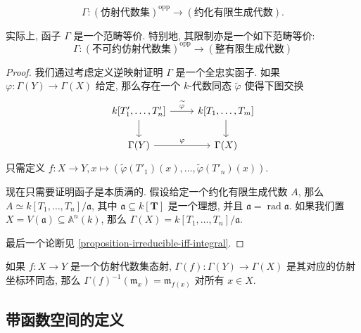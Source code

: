 \[
  \Gamma: (\text{仿射代数集})^{\operatorname{opp}} \to
  (\text{约化有限生成代数}).
\]

\begin{proposition}
  \label{proposition-category-equivalence-irreducible-affine-and-finite-generated-algebra}
  实际上, 函子 \( \Gamma \) 是一个范畴等价. 特别地, 其限制亦是一个如下范畴等价:
  \[
    \Gamma: (\text{不可约仿射代数集})^{\operatorname{opp}} \to
    (\text{整有限生成代数})
  \]
\end{proposition}
\begin{proof}
  我们通过考虑定义逆映射证明 \( \Gamma \) 是一个全忠实函子.
  如果 \( \varphi: \Gamma(Y) \to \Gamma(X) \) 给定, 那么存在一个 \( k
  \)-代数同态 \( \widetilde{\varphi} \) 使得下图交换
  \[\begin{tikzcd}
    {k[T_1', \ldots, T'_n]} & {k[T_1,\ldots,T_m]} \\
    {\Gamma(Y)} & {\Gamma(X)}
    \arrow["{\widetilde{\varphi}}", from=1-1, to=1-2]
    \arrow[from=1-1, to=2-1]
    \arrow[from=1-2, to=2-2]
    \arrow["\varphi", from=2-1, to=2-2]
  \end{tikzcd}\]
  只需定义 \( f: X \to Y, x \mapsto (\widetilde{\varphi}(T'_1)(x),\ldots,
  \widetilde{\varphi}(T'_n)(x)) \).

  现在只需要证明函子是本质满的. 假设给定一个约化有限生成代数 \( A \), 那么 \( A
  \simeq k[T_1,\ldots, T_n]/ \mathfrak{a} \), 其中 \( \mathfrak{a} \subseteq
  k[\mathbf{T}] \) 是一个理想, 并且 \( \mathfrak{a} = \operatorname{rad}
  \mathfrak{a} \). 如果我们置 \( X = V(\mathfrak{a}) \subseteq \mathbb{A}^n(k)
  \), 那么 \( \Gamma(X) = k[T_1,\ldots, T_n] / \mathfrak{a} \).

  最后一个论断见 \cref{proposition-irreducible-iff-integral}.
\end{proof}

\begin{proposition}
  如果 \( f: X \to Y \) 是一个仿射代数集态射, \( \Gamma(f): \Gamma(Y) \to
  \Gamma(X) \) 是其对应的仿射坐标环同态, 那么 \( \Gamma(f)^{-1}(\mathfrak{m}_x)
  = \mathfrak{m}_{f(x)} \) 对所有 \( x \in X \).
\end{proposition}

\subsection{带函数空间的定义}

